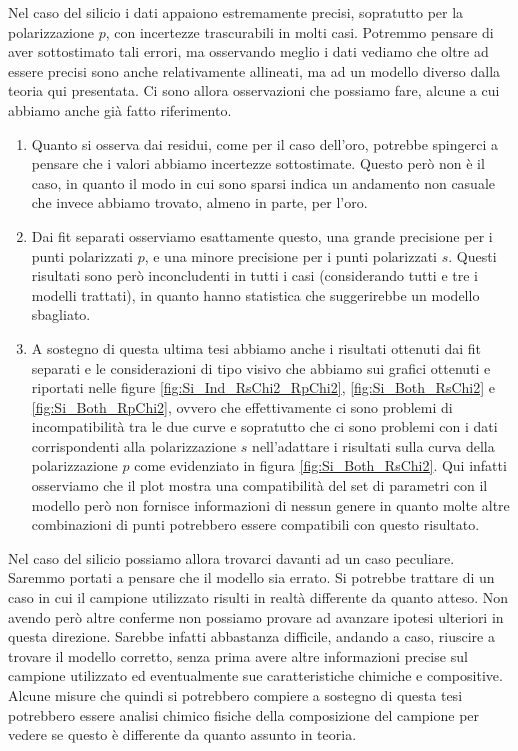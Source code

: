\documentclass[
    prb,altaffilletter,citeautoscript,
    amsmath,amssymb,
    showpacs,showkeys,floatfix,
    reprint
]{revtex4-1}
\begin{document}
Nel caso del silicio i dati appaiono estremamente precisi, sopratutto per la polarizzazione $p$, con incertezze trascurabili in molti casi. Potremmo pensare di aver sottostimato tali errori, ma osservando meglio i dati vediamo che oltre ad essere precisi sono anche relativamente allineati, ma ad un modello diverso dalla teoria qui presentata. Ci sono allora osservazioni che possiamo fare, alcune a cui abbiamo anche già fatto riferimento. \begin{enumerate}
    \item Quanto si osserva dai residui, come per il caso dell'oro, potrebbe spingerci a pensare che i valori abbiamo incertezze sottostimate. Questo però non è il caso, in quanto il modo in cui sono sparsi indica un andamento non casuale che invece abbiamo trovato, almeno in parte, per l'oro. 
    \item Dai fit separati osserviamo esattamente questo, una grande precisione per i punti polarizzati $p$, e una minore precisione per i punti polarizzati $s$. Questi risultati sono però inconcludenti in tutti i casi (considerando tutti e tre i modelli trattati), in quanto hanno statistica che suggerirebbe un modello sbagliato. 
    \item A sostegno di questa ultima tesi abbiamo anche i risultati ottenuti dai fit separati e le considerazioni di tipo visivo che abbiamo sui grafici ottenuti e riportati nelle figure \ref{fig:Si_Ind_RsChi2_RpChi2}, \ref{fig:Si_Both_RsChi2} e \ref{fig:Si_Both_RpChi2}, ovvero che effettivamente ci sono problemi di incompatibilità tra le due curve e sopratutto che ci sono problemi con i dati corrispondenti alla polarizzazione $s$ nell'adattare i risultati sulla curva della polarizzazione $p$ come evidenziato in figura \ref{fig:Si_Both_RsChi2}. Qui infatti osserviamo che il plot mostra una compatibilità del set di parametri con il modello però non fornisce informazioni di nessun genere in quanto molte altre combinazioni di punti potrebbero essere compatibili con questo risultato. 
\end{enumerate}

Nel caso del silicio possiamo allora trovarci davanti ad un caso peculiare. Saremmo portati a pensare che il modello sia errato. Si potrebbe trattare di un caso in cui il campione utilizzato risulti in realtà differente da quanto atteso. Non avendo però altre conferme non possiamo provare ad avanzare ipotesi ulteriori in questa direzione. Sarebbe infatti abbastanza difficile, andando a caso, riuscire a trovare il modello corretto, senza prima avere altre informazioni precise sul campione utilizzato ed eventualmente sue caratteristiche chimiche e compositive. Alcune misure che quindi si potrebbero compiere a sostegno di questa tesi potrebbero essere analisi chimico fisiche della composizione del campione per vedere se questo è differente da quanto assunto in teoria. 
\end{document}
